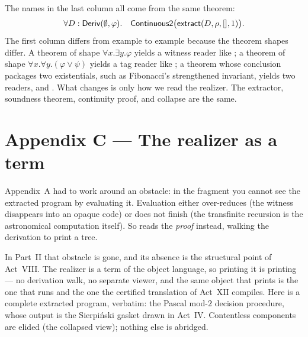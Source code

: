 \documentclass[11pt]{article}
\begin{document}
The names in the last column all come from the same theorem:
\[
  \forall D:\mathsf{Deriv}(\emptyset,\varphi).\quad
  \mathsf{Continuous2}\bigl(\mathsf{extract}(D,\rho,[],1)\bigr).
\]
The first column differs from example to example because the theorem shapes
differ. A theorem of shape $\forall x.\exists y.\varphi$ yields a witness
reader like ; a theorem of shape
$\forall x.\forall y.(\varphi\lor\psi)$ yields a tag reader like
; a theorem whose conclusion packages two existentials, such as
Fibonacci's strengthened invariant, yields two readers,  and
. What changes is only how we read the realizer. The extractor,
soundness theorem, continuity proof, and \CtQ collapse are the same.





\section{Appendix C --- The realizer as a term}
\label{app:term}

Appendix~A had to work around an obstacle: in the fragment you cannot see the
extracted program by evaluating it. Evaluation either over-reduces (the witness
disappears into an opaque code) or does not finish (the transfinite recursion
is the astronomical computation itself). So  reads the
\emph{proof} instead, walking the derivation to print a tree.

In Part~II that obstacle is gone, and its absence is the structural point of
Act~VIII. The realizer is a term of the object language, so printing it is
printing --- no derivation walk, no separate viewer, and the same object that
prints is the one that runs and the one the certified translation of Act~XII
compiles. Here is a complete extracted program, verbatim: the Pascal
mod-$2$ decision procedure, whose output is the Sierpi\'nski gasket drawn in
Act~IV. Contentless components are elided (the collapsed view); nothing else
is abridged.
\end{document}
